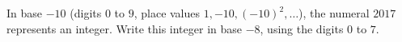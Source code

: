 In base $-10$ (digits $0$ to $9$, place values $1,-10,(-10)^2,\dots$), the numeral $2017$ represents an integer. Write this integer in base $-8$, using the digits $0$ to $7$.
